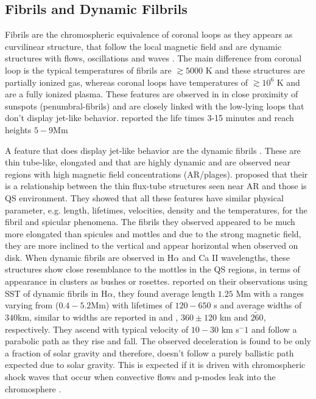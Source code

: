 \documentclass[12pt]{ociamthesis}
\begin{document}
\subsection{Fibrils and Dynamic Filbrils}
\label{subsec:dfibs}
Fibrils are the chromospheric equivalence of coronal loops as they appears as curvilinear structure, that follow the local magnetic field and are dynamic structures with flows, oscillations and waves \cite{Aschwanden2019ASSL}. The main difference from coronal loop is the typical temperatures of fibrils are $\gtrsim 5000$ K and these structures are partially ionized gas, whereas coronal loops have temperatures of $\gtrsim 10^6$ K and are a fully ionized plasma. These features are observed in in close proximity of sunspots (penumbral-fibrils) and are closely linked with the low-lying loops that don't display jet-like behavior. \cite{Beckers1968} reported the life times 3-15 minutes and reach heights $5-9$Mm \\
\par A feature that does display jet-like behavior are the dynamic fibrils \citep{De_Pontieu2007ApJ,Hansteen2006ApJ}. These are thin tube-like, elongated and that are highly dynamic and are observed near regions with high magnetic field concentrations (AR/plages). \cite{Foukal1971SoPh1959F,Foukal1971SoPh20298F} proposed that their is a relationship between the thin flux-tube structures seen near AR and those is QS environment. They showed that all these features have similar physical parameter, e.g. length, lifetimes, velocities, density and the temperatures, for the fibril and spicular phenomena. The fibrils they observed appeared to be much more elongated than spicules and mottles and due to the strong magnetic field, they are more inclined to the vertical and appear horizontal when observed on disk. When dynamic fibrils are observed in H$\alpha$ and Ca II wavelengths, these structures show close resemblance to the mottles in the QS regions, in terms of appearance in clusters as bushes or rosettes.    \cite{De_Pontieu2007ApJ} reported on their observations using SST of dynamic fibrils in H$\alpha$, they found average length $1.25$ Mm with a ranges varying from ($0.4-5.2$Mm) with lifetimes of $120-650$ s and average widths of $340$km, similar to widths are reported in \cite{Morton2012NatCo31315M} and \cite{Gafeira2017ApJS2297G}, $360\pm120$ km and $\tilde{260}$, respectively. They ascend with typical velocity of $10-30$ km s$^-1$ and follow a parabolic path as they rise and fall. The observed deceleration is found to be only a fraction of solar gravity and therefore, doesn't follow a purely ballistic path expected due to solar gravity. This  is expected if it is driven with chromospheric shock waves that occur when convective flows and p-modes leak into the chromosphere \citep{Langangen2008ApJ6731194L,De_Pontieu2007ApJ}.        
\end{document}
